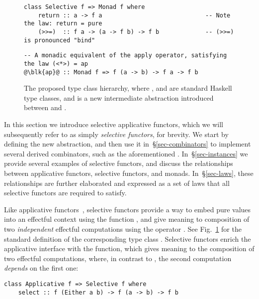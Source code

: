 \begin{figure}
\begin{verbatim}
class Selective f => Monad f where
    return :: a -> f a                             -- Note the law: return = pure
    (>>=)  :: f a -> (a -> f b) -> f b             -- (>>=) is pronounced "bind"
\end{verbatim}
\vspace{0.5mm}
\begin{verbatim}
-- A monadic equivalent of the apply operator, satisfying the law (<*>) = ap
@\blk{ap}@ :: Monad f => f (a -> b) -> f a -> f b
\end{verbatim}
\caption{The proposed type class hierarchy, where , 
and  are standard Haskell type classes, and  is
a new intermediate abstraction introduced between  and
.}\label{fig-types}
\vspace{-2mm}
\end{figure}

In this section we introduce selective applicative functors, which we will
subsequently refer to as simply \emph{selective functors}, for brevity. We start
by defining the new abstraction, and then use it in~\S\ref{sec-combinators} to
implement several derived combinators, such as the aforementioned .
In~\S\ref{sec-instances} we provide several examples of selective functors, and
discuss the relationships between applicative functors, selective functors, and
monads. In~\S\ref{sec-laws}, these relationships are further elaborated and
expressed as a set of laws that all selective functors are required to satisfy.

Like applicative functors~\citep{mcbride2008applicative}, selective functors
provide a way to embed pure values into an effectful context  using the
function , and give meaning to composition of two \emph{independent}
effectful computations using the operator \hs{<*>}. See Fig.~\ref{fig-types} for
the standard definition of the corresponding type class .
Selective functors enrich the applicative interface with the 
function, which gives meaning to the composition of two effectful computations,
where, in contrast to \hs{<*>}, the second computation \emph{depends} on the
first one:

\vspace{1mm}
\begin{verbatim}
class Applicative f => Selective f where
    select :: f (Either a b) -> f (a -> b) -> f b
\end{verbatim}
\vspace{1mm}

